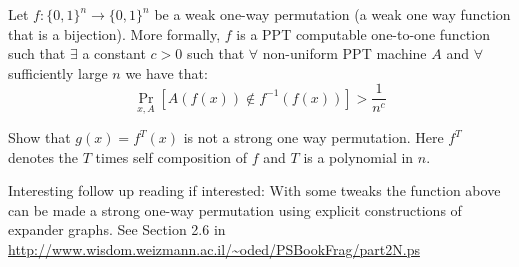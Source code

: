 \begin{exercise}
 Let $f:\{0,1\}^n\to \{0,1\}^{n}$ be a weak one-way permutation (a weak one way function that is a bijection). More formally, $f$ is a PPT computable one-to-one function such that $\exists$ a constant $c >0$ such that $\forall$ non-uniform PPT machine $A$ and $\forall$ sufficiently large $n$ we have that:
    \[\Pr_{x,A}[A(f(x)) \not\in f^{-1}(f(x))] > \frac{1}{n^c}\]

     Show that $g(x) = f^T(x)$ is not a strong one way permutation. Here $f^T$ denotes the $T$ times self composition of $f$ and $T$ is a polynomial in $n$.

     Interesting follow up reading if interested: With some tweaks the function above can be made a strong one-way permutation using explicit constructions of expander graphs. See Section 2.6 in \url{http://www.wisdom.weizmann.ac.il/~oded/PSBookFrag/part2N.ps}
\end{exercise}




